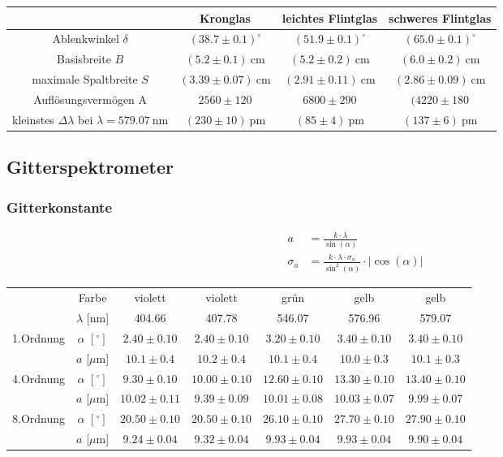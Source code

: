 \documentclass[12pt,a4paper,titlepage,headinclude,bibtotoc]{scrartcl}
\begin{document}
\begin{table}[!htb]
	\centering
	\begin{tabular}{|c|c|c|c|}
		\hline		
		& Kronglas & leichtes Flintglas & schweres Flintglas \\
		\hline
	    Ablenkwinkel $\delta$ & $(38.7\pm 0.1)^\circ$ &  $(51.9\pm 0.1)^\circ$ & $(65.0\pm 0.1)^\circ$ \\
	    Basisbreite $B$ & $(5.2 \pm 0.1)~$cm & $(5.2 \pm 0.2)~$cm &$(6.0 \pm 0.2)~$cm \\
	    maximale Spaltbreite $S$ & $(3.39 \pm 0.07)~$cm & $(2.91 \pm 0.11)~$cm & $(2.86 \pm 0.09)~$cm \\
	    Auflösungsvermögen A& $2560 \pm 120$ & $6800 \pm 290$ & $(4220 \pm 180$ \\
		kleinstes $\Delta \lambda$ bei $\lambda=579.07~$nm& $(230 \pm 10)~$pm & $(85 \pm 4)~$pm & $(137 \pm 6)~$pm	\\
		\hline
	\end{tabular}
\end{table}

\subsection{Gitterspektrometer}
\subsubsection{Gitterkonstante}
\begin{align}
	a&=\frac{k \cdot \lambda}{\sin{\left (\alpha \right )}}\\
	\sigma_{a}&=\frac{k \cdot \lambda \cdot \sigma_{\alpha}}{\sin^{2}{\left (\alpha \right )}} \cdot \left\lvert{\cos{\left (\alpha \right )}}\right\rvert
\end{align}


\begin{table}[!htb]
	\centering	
	\begin{tabular}{|c|c|c|c|c|c|c|}
		\hline
		&Farbe & violett & violett & grün & gelb & gelb \\
		& $\lambda$ [nm]& 404.66 & 407.78 & 546.07 & 576.96 & 579.07\\
		\hline
		1.Ordnung & $\alpha$ $[^\circ]$ & $2.40 \pm 0.10$ & $2.40 \pm 0.10$ & $3.20 \pm 0.10$ & $3.40 \pm 0.10$ & $3.40 \pm 0.10$ \\ 
		& $a$ [$\mu$m] & $10.1 \pm 0.4$ & $10.2 \pm 0.4$ & $10.1 \pm 0.4$ & $10.0 \pm 0.3$ & $10.1 \pm 0.3$\\
		\hline
		4.Ordnung & $\alpha$ $[^\circ]$  & $9.30 \pm 0.10$
& $10.00 \pm 0.10$ & $12.60 \pm 0.10$ & $13.30 \pm 0.10$ & $13.40 \pm 0.10$ \\
		& $a$ [$\mu$m] & $10.02 \pm 0.11$ & $9.39 \pm 0.09$ & $10.01 \pm 0.08$ & $10.03 \pm 0.07$ & $9.99 \pm 0.07$ \\
		\hline
		8.Ordnung & $\alpha$ $[^\circ]$ & $20.50 \pm 0.10$
& $20.50 \pm 0.10$ & $26.10 \pm 0.10$ & $27.70 \pm 0.10$ & $27.90 \pm 0.10$ \\
		& $a$ [$\mu$m] & $9.24 \pm 0.04$ & $9.32 \pm 0.04$ & $9.93 \pm 0.04$ & $9.93 \pm 0.04$ & $9.90 \pm 0.04$ \\
		\hline
	\end{tabular}
\end{table}
\end{document}
